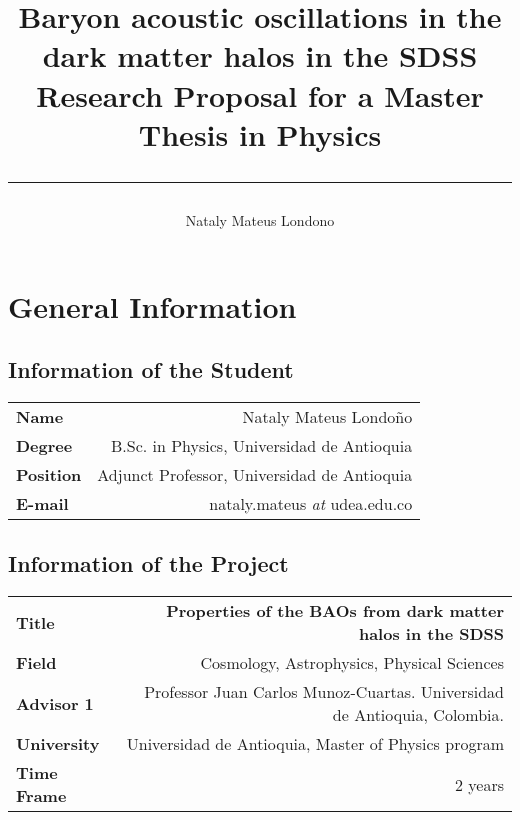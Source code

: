 \documentclass[a4,useAMS,usenatbib,usegraphicx,12pt]{article}
\title{ {\textbf{Baryon acoustic oscillations in the dark matter halos in the SDSS}}\\ 
				\Large Research Proposal for a Master Thesis in Physics\\ 
				\color{black}\rule{15cm}{0.5mm} }
\author{Nataly Mateus Londono}
\date{}
\begin{document}
  
\maketitle
\hypersetup{linkbordercolor=white}
\tableofcontents
 
\newpage 

\section{General Information}
\small
\subsection*{Information of the Student}
\begin{tabular}{L!{\VRule}R}
\bf Name		& Nataly Mateus Londoño\\
\bf Degree		& B.Sc. in Physics, Universidad de Antioquia \\
\bf Position	& Adjunct Professor, Universidad de Antioquia\\
\bf E-mail	&  nataly.mateus \textit{at} udea.edu.co \\
\end{tabular}

\vspace{10pt}


\vspace{15pt}  

\subsection*{Information of the Project}
\begin{tabular}{L!{\VRule}R}
\bf Title		& \bf Properties of the BAOs from dark matter halos in the SDSS \\
\bf Field		& Cosmology, Astrophysics, Physical Sciences \\
\bf Advisor 1	& Professor Juan Carlos Munoz-Cuartas. Universidad de Antioquia, Colombia.\\
\bf University	& Universidad de Antioquia, Master of Physics program \\
\bf Time Frame	& 2 years \\
\end{tabular}
\normalsize
\end{document}
